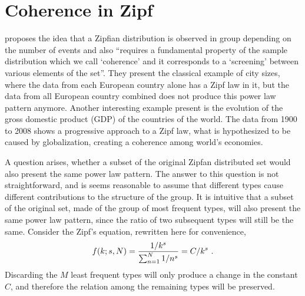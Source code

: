 \section{Coherence in Zipf}
\label{sec:coherencezipf}
\cite{cristelli2012} proposes the idea that a Zipfian distribution is observed in group 
depending on the number of events and also ``requires a fundamental property of the sample
distribution which we call `coherence' and it corresponds to a `screening' between various
elements of the set''. They present the classical example of city sizes, 
where the data from each European country alone has a Zipf law in it, but the data from
all European country combined does not produce this power law pattern anymore. Another
interesting example present is the evolution of the gross domestic product (GDP) of the 
countries of the world. The data from 1900 to 2008 shows a progressive approach to a
Zipf law, what is hypothesized to be caused by globalization, creating a coherence among
world's economies.

A question arises, whether a subset of the original Zipfan distributed set would also
present the same power law pattern. The answer to this question is not straightforward,
and is seems reasonable to assume that different types cause different contributions 
to the structure of the group. It is intuitive that a subset of the original set, 
made of the group of most frequent types, will also present the same power law pattern,
since the ratio of two subsequent types will still be the same. Consider the Zipf's equation,
rewritten here for convenience,
\begin{equation} 
f(k; s, N) = \frac{1/k^s}{\sum_{n=1}^{N} 1/n^s} = C / k^s \textmd{ .}
\end{equation}
Discarding the $M$ least frequent types will only produce a change in the constant $C$,
and therefore the relation among the remaining types will be preserved.

